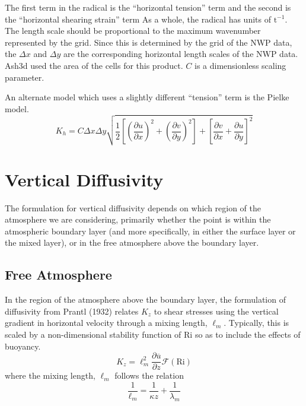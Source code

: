 The first term in the radical is the ``horizontal tension'' term and the second is
the ``horizontal shearing strain'' term %
As a whole, the radical has units of $\mathrm{t}^{-1}$.
The length scale should be proportional to the maximum wavenumber represented by the grid.
Since this is determined by the grid of the NWP data, the $\Delta x$ and $\Delta y$ are the 
corresponding horizontal length scales of the NWP data. Ash3d used the area of the cells
for this product. $C$ is a dimensionless scaling parameter.

An alternate model which uses a slightly different ``tension'' term is the Pielke model.
\begin{equation}\label{VarDiff_Eq_Pielke}
K_h = C \Delta x \Delta y \sqrt{
\frac{1}{2}\left[ \left(\frac{\partial u}{\partial x}\right)^2 + \left(\frac{\partial v}{\partial y}\right)^2 \right]
+ \left[ \frac{\partial v}{\partial x} +\frac{\partial u}{\partial y} \right]^2}
\end{equation}


\section{Vertical Diffusivity}\label{ChapAppendVarDiff_Sec_Kv}
The formulation for vertical diffusivity depends on which region of the atmosphere
we are considering, primarily whether the point is within the atmospheric boundary
layer (and more specifically, in either the surface layer or the mixed layer),
or in the free atmosphere above the boundary layer.

\subsection{Free Atmosphere}
In the region of the atmosphere above the boundary layer, the formulation of diffusivity
from Prantl (1932) relates $K_z$ to shear stresses using the vertical gradient in
horizontal velocity through a mixing length, $\ell_m$. %
Typically, this is scaled by a non-dimensional stability function of $\mathrm{Ri}$ so as to
include the effects of buoyancy.
\begin{equation}\label{VarDiff_Eq_Kz_FreAtmos}
K_z = \ell_m^2 \frac{\partial \overline{u}}{\partial z}  \mathcal{F}(\mathrm{Ri})
\end{equation}
where the mixing length, $\ell_m$ follows the relation
\begin{equation}\label{VarDiff_Eq_MixLen}
\frac{1}{\ell_m} = \frac{1}{\kappa z} + \frac{1}{\lambda_m}
\end{equation}

